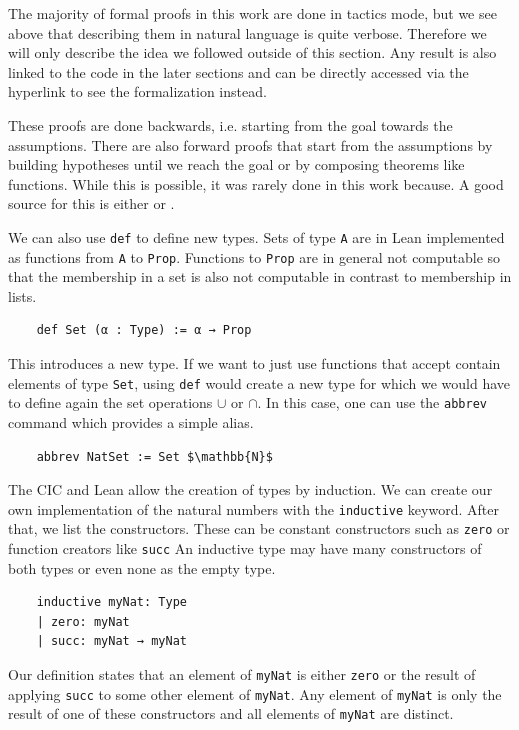 The majority of formal proofs in this work are done in tactics mode, but we see above that describing them in natural language is quite verbose. Therefore we will only describe the idea we followed outside of this section. Any result is also linked to the code in the later sections and can be directly accessed via the hyperlink to see the formalization instead.

These proofs are done backwards, i.e. starting from the goal towards the assumptions. There are also forward proofs that start from the assumptions by building hypotheses until we reach the goal or by composing theorems like functions. While this is possible, it was rarely done in this work because. A good source for this is either \cite{theoremProvingLean} or \cite{HitchhikerLogicVer}.


We can also use \lstinline|def| to define new types. Sets of type \lstinline|A| are in Lean implemented as functions from \lstinline|A| to \lstinline|Prop|. Functions to \lstinline|Prop| are in general not computable so that the membership in a set is also not computable in contrast to membership in lists.

\begin{lstlisting}
    def Set (α : Type) := α → Prop
\end{lstlisting}

This introduces a new type. If we want to just use functions that accept contain elements of type \lstinline|Set|, using \lstinline|def| would create a new type for which we would have to define again the set operations $\cup$ or $\cap$. In this case, one can use the \lstinline|abbrev| command which provides a simple alias.

\begin{lstlisting}
    abbrev NatSet := Set $\mathbb{N}$
\end{lstlisting}

The CIC and Lean allow the creation of types by induction. We can create our own implementation of the natural numbers with the \lstinline|inductive| keyword. After that, we list the constructors. These can be constant constructors such as \lstinline|zero| or function creators like \lstinline|succ|
An inductive type may have many constructors of both types or even none as the empty type.

\begin{lstlisting}
    inductive myNat: Type
    | zero: myNat
    | succ: myNat → myNat
\end{lstlisting}

Our definition states that an element of \lstinline|myNat| is either \lstinline|zero| or the result of applying \lstinline|succ| to some other element of \lstinline|myNat|. Any element of \lstinline|myNat| is only the result of one of these constructors and all elements of \lstinline|myNat| are distinct.

